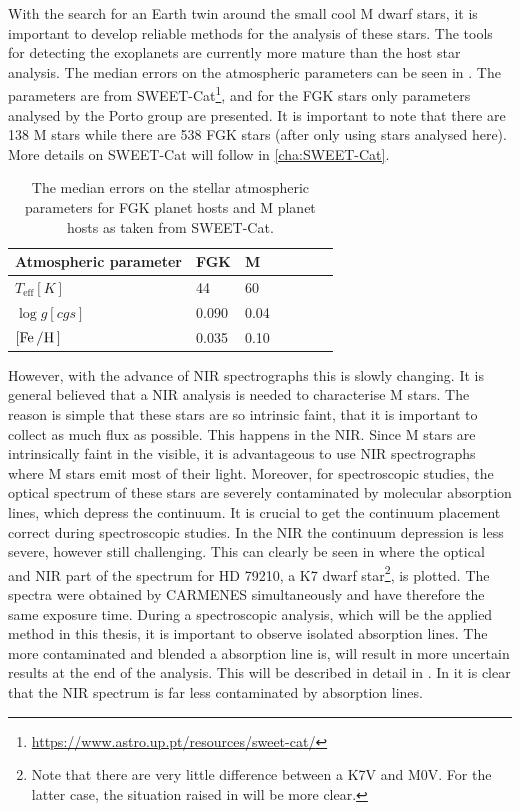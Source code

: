 With the search for an Earth twin around the small cool M dwarf stars, it is important to develop
reliable methods for the analysis of these stars. The tools for detecting the exoplanets are
currently more mature than the host star analysis. The median errors on the atmospheric parameters
can be seen in . The parameters are from SWEET-Cat\footnote{
\url{https://www.astro.up.pt/resources/sweet-cat/}}, and for the FGK stars only parameters analysed
by the Porto group are presented. It is important to note that there are 138 M stars while there are
538 FGK stars (after only using stars analysed here). More details on SWEET-Cat will follow in
\cref{cha:SWEET-Cat}.
\begin{table}[htb!]
    \caption{The median errors on the stellar atmospheric parameters for FGK planet hosts and M
             planet hosts as taken from SWEET-Cat.}
    \label{tab:standardErrors}
    \centering
    \begin{tabular}{lllllll}
      \hline\hline
        Atmospheric parameter      & FGK    & M    \\
      \hline
        $T_\mathrm{eff} [\si{K}]$  & 44     & 60   \\
        $\log g [\si{cgs}]$        & 0.090  & 0.04 \\
        $[\ion{Fe}/\ion{H}]$       & 0.035  & 0.10 \\
      \hline
    \end{tabular}
\end{table}
However, with the advance of NIR spectrographs this is slowly changing. It is general believed that
a NIR analysis is needed to characterise M stars. The reason is simple that these stars are so
intrinsic faint, that it is important to collect as much flux as possible. This happens in the NIR.
Since M stars are intrinsically faint in the visible, it is advantageous to use NIR spectrographs
where M stars emit most of their light. Moreover, for spectroscopic studies, the optical spectrum of
these stars are severely contaminated by molecular absorption lines, which depress the continuum. It
is crucial to get the continuum placement correct during spectroscopic studies. In the NIR the
continuum depression is less severe, however still challenging. This can clearly be seen in
 where the optical and NIR part of the spectrum for HD 79210, a K7 dwarf
star\footnote{Note that there are very little difference between a K7V and M0V. For the latter case,
the situation raised in  will be more clear.}, is plotted. The spectra were
obtained by CARMENES simultaneously and have therefore the same exposure time. During a
spectroscopic analysis, which will be the applied method in this thesis, it is important to observe
isolated absorption lines. The more contaminated and blended a absorption line is, will result in
more uncertain results at the end of the analysis. This will be described in detail in
. In  it is clear that the NIR spectrum is far less
contaminated by absorption lines.

